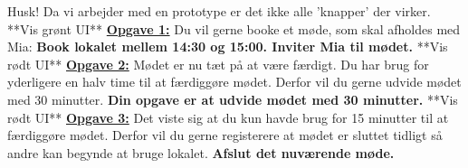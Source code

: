 Husk! Da vi arbejder med en prototype er det ikke alle ’knapper’ der virker. 
\newline\newline
**Vis grønt UI**
\newline\newline
\underline{\textbf{Opgave 1:}}
Du vil gerne booke et møde, som skal afholdes med Mia:
\newline
\textbf{Book lokalet mellem 14:30 og 15:00. Inviter Mia til mødet.}
\newline\newline
**Vis rødt UI**
\newline\newline
\underline{\textbf{Opgave 2:}}
Mødet er nu tæt på at være færdigt. Du har brug for yderligere en halv time til at færdiggøre mødet.  Derfor vil du gerne udvide mødet med 30 minutter. 
\newline
\textbf{Din opgave er at udvide mødet med 30 minutter. }
\newline\newline
**Vis rødt UI**
\newline\newline
\underline{\textbf{Opgave 3:}}
Det viste sig at du kun havde brug for 15 minutter til at færdiggøre mødet. Derfor vil du gerne registerere at mødet er sluttet tidligt så andre kan begynde at bruge lokalet.
\newline
\textbf{Afslut det nuværende møde. }